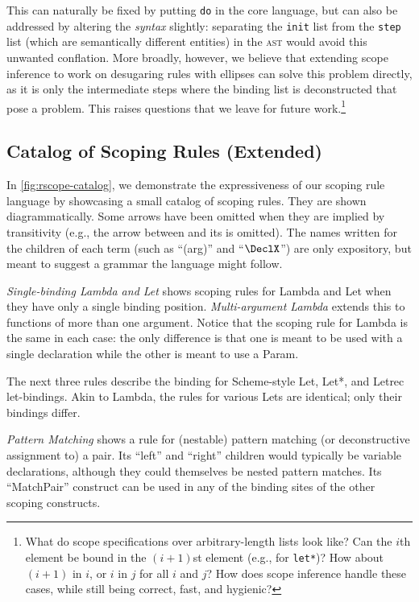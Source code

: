 This can naturally be fixed by putting \texttt{do} in the core
language, but can also be addressed by altering the \emph{syntax}
slightly: separating the \texttt{init} list from the \texttt{step}
list (which are semantically different entities) in the \textsc{ast}
would avoid this unwanted conflation.
More broadly, however, we believe that
extending scope inference to work on desugaring rules with ellipses
can solve this problem directly, as it is only the intermediate
steps where the binding list is deconstructed that pose a problem.
This raises questions that we leave for future work.\footnote{
  What do scope specifications over arbitrary-length lists look like?
  Can the $i$th element be bound in the $(i\!+\!1)$st element (e.g., for
  \texttt{let*})? How about $(i\!+\!1)$ in $i$, or $i$ in $j$ for all $i$ and $j$? How
  does scope inference handle these cases, while still being
  correct, fast, and hygienic?}

  \subsection{Catalog of Scoping Rules (Extended)}
  \label{sec:rscope-catalog}
  In \cref{fig:rscope-catalog}, we demonstrate the expressiveness of our
  scoping rule language by showcasing a small catalog of scoping rules.
  They are shown diagrammatically. Some arrows have been omitted when
  they are implied by transitivity (e.g., the arrow between
   and its  is omitted). The names written for the
  children of each term (such as ``(arg)'' and ``$\DeclX$'') are
  only expository, but meant to suggest a grammar the language might follow.
  
  \emph{Single-binding Lambda and Let}
  shows scoping rules for Lambda and Let when they have only a single
  binding position. \emph{Multi-argument Lambda} extends this to functions
  of more than one argument. Notice that the scoping rule for Lambda
  is the same in each case: the only difference is that one is meant to
  be used with a single declaration while the other is meant to use a
  Param.
  
  The next three rules describe the binding for Scheme-style Let, Let*,
  and Letrec let-bindings. Akin to Lambda, the rules for various Lets
  are identical; only their bindings differ.
  
  \emph{Pattern Matching} shows a rule for (nestable) pattern
  matching (or deconstructive assignment to) a pair. Its ``left'' and
  ``right'' children would typically be variable declarations, although
  they could themselves be nested pattern matches. Its ``MatchPair''
  construct can be used in any of the binding sites of the other scoping
  constructs.
  
